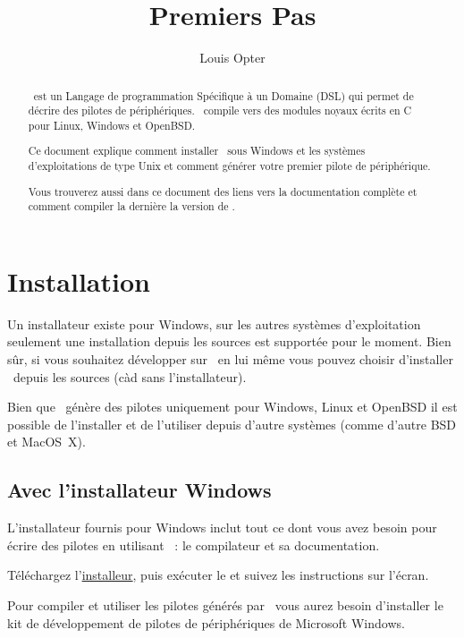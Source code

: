 \documentclass[francais]{rtxarticle}
\title{Premiers Pas}
\author{Louis Opter}
\begin{document}
\maketitle

\begin{abstract}
\rtx\ est un Langage de programmation Spécifique à un Domaine (DSL) qui permet
de décrire des pilotes de périphériques. \rtx\ compile vers des modules noyaux
écrits en C pour Linux, Windows et OpenBSD.

Ce document explique comment installer \rtx\ sous Windows et les systèmes
d'exploitations de type Unix et comment générer votre premier pilote de
périphérique.

Vous trouverez aussi dans ce document des liens vers la documentation complète
et comment compiler la dernière la version de \rtx.
\end{abstract}

\tableofcontents

\pagebreak

\section{Installation}

Un installateur existe pour Windows, sur les autres systèmes d'exploitation
seulement une installation depuis les sources est supportée pour le moment.
Bien sûr, si vous souhaitez développer sur \rtx\ en lui même vous pouvez
choisir d'installer \rtx\ depuis les sources (càd sans l'installateur).

Bien que \rtx\ génère des pilotes uniquement pour Windows, Linux et OpenBSD il
est possible de l'installer et de l'utiliser depuis d'autre systèmes (comme
d'autre BSD et MacOS~X).

\subsection{Avec l'installateur Windows}

L'installateur fournis pour Windows inclut tout ce dont vous avez besoin pour
écrire des pilotes en utilisant \rtx\ : le compilateur et sa documentation.

Téléchargez l'\href{http://rathaxes.googlecode.com/files/rathaxes-latest.exe}{installeur},
puis exécuter le et suivez les instructions sur l'écran.

Pour compiler et utiliser les pilotes générés par \rtx\ vous aurez besoin
d'installer le kit de développement de pilotes de périphériques de Microsoft
Windows.
\end{document}
